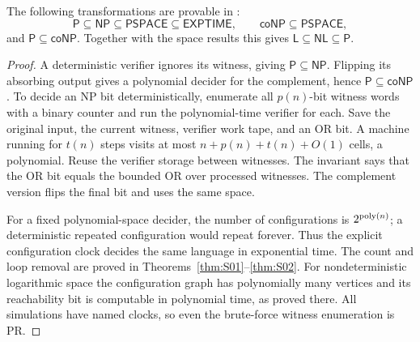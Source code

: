\begin{theorem}\label{thm:C01}
The following transformations are provable in \ipra:
\[
 \mathsf P\subseteq\mathsf{NP}\subseteq\mathsf{PSPACE}
 \subseteq\mathsf{EXPTIME},\qquad
 \mathsf{coNP}\subseteq\mathsf{PSPACE},
\]
and $\mathsf P\subseteq\mathsf{coNP}$. Together with the space results this gives
$\mathsf L\subseteq\mathsf{NL}\subseteq\mathsf P$.
\end{theorem}
\begin{proof}
A deterministic verifier ignores its witness, giving $\mathsf P\subseteq\mathsf{NP}$. Flipping its absorbing output gives a polynomial decider for the complement, hence $\mathsf P\subseteq\mathsf{coNP}$. To decide an NP bit deterministically, enumerate all $p(n)$-bit witness words with a binary counter and run the polynomial-time verifier for each. Save the original input, the current witness, verifier work tape, and an OR bit. A machine running for $t(n)$ steps visits at most $n+p(n)+t(n)+O(1)$ cells, a polynomial. Reuse the verifier storage between witnesses. The invariant says that the OR bit equals the bounded OR over processed witnesses. The complement version flips the final bit and uses the same space.

For a fixed polynomial-space decider, the number of configurations is $2^{\operatorname{poly}(n)}$; a deterministic repeated configuration would repeat forever. Thus the explicit configuration clock decides the same language in exponential time. The count and loop removal are proved in Theorems~\ref{thm:S01}--\ref{thm:S02}. For nondeterministic logarithmic space the configuration graph has polynomially many vertices and its reachability bit is computable in polynomial time, as proved there. All simulations have named clocks, so even the brute-force witness enumeration is PR.
\end{proof}

